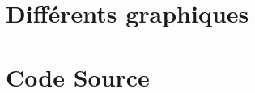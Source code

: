 \begin{appendices}
    \chapter{Différents graphiques}
    
    \chapter{Code Source}
    \label{codesource}
    
\end{appendices}
